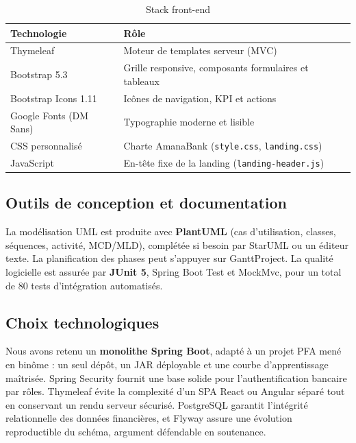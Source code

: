 \documentclass[11pt,a4paper,oneside]{report}
\begin{document}
\begin{table}[H]
    \centering
    \caption{Stack front-end}
    \label{tab:stack-frontend}
    \begin{tabular}{@{}lp{9cm}@{}}
        \rowcolor{AmanaBrown}
        \color{white}\textbf{Technologie} & \textbf{Rôle} \\
        \midrule
        Thymeleaf & Moteur de templates serveur (MVC) \\
        Bootstrap 5.3 & Grille responsive, composants formulaires et tableaux \\
        Bootstrap Icons 1.11 & Icônes de navigation, KPI et actions \\
        Google Fonts (DM Sans) & Typographie moderne et lisible \\
        CSS personnalisé & Charte AmanaBank (\texttt{style.css}, \texttt{landing.css}) \\
        JavaScript & En-tête fixe de la landing (\texttt{landing-header.js}) \\
        \bottomrule
    \end{tabular}
\end{table}

\subsection{Outils de conception et documentation}

La modélisation UML est produite avec \textbf{PlantUML} (cas d'utilisation, classes, séquences, activité, MCD/MLD), complétée si besoin par StarUML ou un éditeur texte. La planification des phases peut s'appuyer sur GanttProject. La qualité logicielle est assurée par \textbf{JUnit 5}, Spring Boot Test et MockMvc, pour un total de 80 tests d'intégration automatisés.

\subsection{Choix technologiques}

Nous avons retenu un \textbf{monolithe Spring Boot}, adapté à un projet PFA mené en binôme : un seul dépôt, un JAR déployable et une courbe d'apprentissage maîtrisée. Spring Security fournit une base solide pour l'authentification bancaire par rôles. Thymeleaf évite la complexité d'un SPA React ou Angular séparé tout en conservant un rendu serveur sécurisé. PostgreSQL garantit l'intégrité relationnelle des données financières, et Flyway assure une évolution reproductible du schéma, argument défendable en soutenance.
\end{document}
